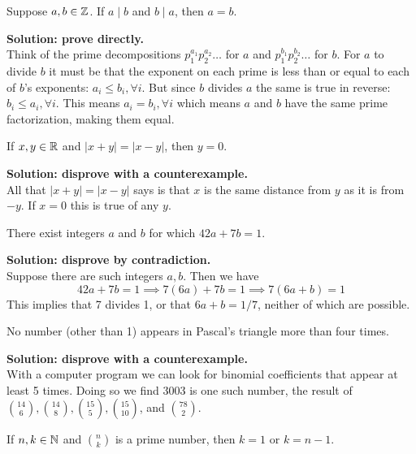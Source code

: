 \documentclass{article}
\begin{document}
\begin{problem}
Suppose $a, b \in \mathbb{Z}$. If $a \mid b$ and $b \mid a$, then $a = b$.
\end{problem}

\textbf{Solution: prove directly.}
\\

Think of the prime decompositions $p_1^{a_1}p_2^{a_2}\ldots$ for $a$ and $p_1^{b_1}p_2^{b_2}\ldots$ for $b$. For $a$ to divide $b$ it must be that the exponent on each prime is less than or equal to each of $b$'s exponents: $a_i \leq b_i, \forall i$. But since $b$ divides $a$ the same is true in reverse: $b_i \leq a_i, \forall i$. This means $a_i = b_i, \forall i$ which means $a$ and $b$ have the same prime factorization, making them equal.

\begin{problem}
If $x, y \in \mathbb{R}$ and $|x + y| = |x - y|$, then $y = 0$.
\end{problem}

\textbf{Solution: disprove with a counterexample.}
\\

All that $|x + y| = |x -y|$ says is that $x$ is the same distance from $y$ as it is from $-y$. If $x = 0$ this is true of any $y$.

\begin{problem}
There exist integers $a$ and $b$ for which $42a + 7b = 1$.
\end{problem}
\textbf{Solution: disprove by contradiction.}
\\

Suppose there are such integers $a, b$. Then we have
$$42a + 7b = 1 \implies 7(6a) + 7b = 1 \implies 7(6a + b) = 1$$
This implies that 7 divides 1, or that $6a + b = 1/7$, neither of which are possible.

\begin{problem}
No number (other than 1) appears in Pascal's triangle more than four times.
\end{problem}
\textbf{Solution: disprove with a counterexample.}
\\

With a computer program we can look for binomial coefficients that appear at least 5 times. Doing so we find 3003 is one such number, the result of $\binom{14}{6}, \binom{14}{8}, \binom{15}{5}, \binom{15}{10}$, and $\binom{78}{2}$.

\begin{problem}
If $n, k \in \mathbb{N}$ and $\binom{n}{k}$ is a prime number, then $k = 1$ or $k = n - 1$.
\end{problem}
\end{document}
